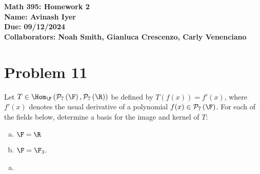 \documentclass[10pt]{mypackage}
\begin{document}
\RaggedRight
\begin{center}
  \bfseries
  Math 395: Homework 2\\
  Name: Avinash Iyer\\
  Due: 09/12/2024\\
  Collaborators: Noah Smith, Gianluca Crescenzo, Carly Venenciano
\end{center}
\section{Problem 11}%
\begin{problem}
  Let $T\in \Hom_{\F}\left(\mathcal{P}_7\left(\F\right),\mathcal{P}_{7}\left(\R\right)\right)$ be defined by $T\left(f(x)\right) = f'(x)$, where $f'(x)$ denotes the usual derivative of a polynomial $f(x)\in \mathcal{P}_{7}\left(\F\right)$. For each of the fields below, determine a basis for the image and kernel of $T$:
  \begin{enumerate}[(a)]
    \item $\F = \R$
    \item $\F = \F_{3}$.
  \end{enumerate}
\end{problem}
\begin{solution}
  \begin{enumerate}[(a)]
    \item 
  \end{enumerate}
\end{solution}
\end{document}

